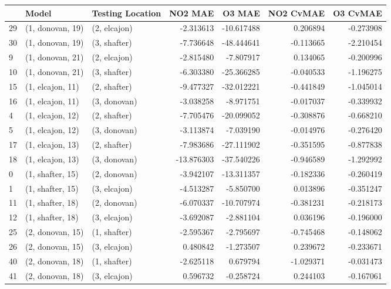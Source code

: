 \begin{tabular}{lllrrrr}
\toprule
{} &             Model & Testing Location &    NO2 MAE &     O3 MAE &  NO2 CvMAE &  O3 CvMAE \\
\midrule
29 &  (1, donovan, 19) &     (2, elcajon) &  -2.313613 & -10.617488 &   0.206894 & -0.273908 \\
30 &  (1, donovan, 19) &     (3, shafter) &  -7.736648 & -48.444641 &  -0.113665 & -2.210454 \\
9  &  (1, donovan, 21) &     (2, elcajon) &  -2.815480 &  -7.807917 &   0.134065 & -0.200996 \\
10 &  (1, donovan, 21) &     (3, shafter) &  -6.303380 & -25.366285 &  -0.040533 & -1.196275 \\
15 &  (1, elcajon, 11) &     (2, shafter) &  -9.477327 & -32.012221 &  -0.441849 & -1.045014 \\
16 &  (1, elcajon, 11) &     (3, donovan) &  -3.038258 &  -8.971751 &  -0.017037 & -0.339932 \\
4  &  (1, elcajon, 12) &     (2, shafter) &  -7.705476 & -20.099052 &  -0.308876 & -0.668210 \\
5  &  (1, elcajon, 12) &     (3, donovan) &  -3.113874 &  -7.039190 &  -0.014976 & -0.276420 \\
17 &  (1, elcajon, 13) &     (2, shafter) &  -7.983686 & -27.111902 &  -0.351595 & -0.877838 \\
18 &  (1, elcajon, 13) &     (3, donovan) & -13.876303 & -37.540226 &  -0.946589 & -1.292992 \\
0  &  (1, shafter, 15) &     (2, donovan) &  -3.942107 & -13.311357 &  -0.182336 & -0.260419 \\
1  &  (1, shafter, 15) &     (3, elcajon) &  -4.513287 &  -5.850700 &   0.013896 & -0.351247 \\
11 &  (1, shafter, 18) &     (2, donovan) &  -6.070337 & -10.707974 &  -0.381231 & -0.218173 \\
12 &  (1, shafter, 18) &     (3, elcajon) &  -3.692087 &  -2.881104 &   0.036196 & -0.196000 \\
25 &  (2, donovan, 15) &     (1, shafter) &  -2.595367 &  -2.795697 &  -0.745468 & -0.148062 \\
26 &  (2, donovan, 15) &     (3, elcajon) &   0.480842 &  -1.273507 &   0.239672 & -0.233671 \\
40 &  (2, donovan, 18) &     (1, shafter) &  -2.625118 &   0.679794 &  -1.029371 & -0.031473 \\
41 &  (2, donovan, 18) &     (3, elcajon) &   0.596732 &  -0.258724 &   0.244103 & -0.167061 \\

\end{tabular}
